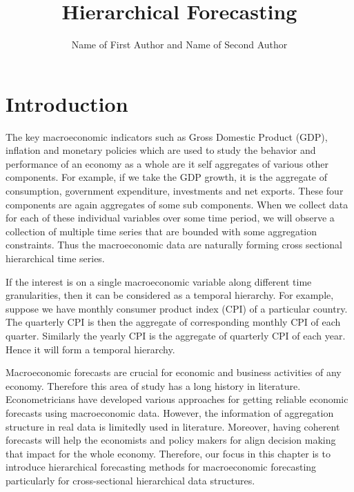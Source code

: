 \documentclass[graybox]{svmult}
\begin{document}
\title*{Hierarchical Forecasting}
\author{Name of First Author and Name of Second Author}
%
%
\maketitle



\section{Introduction}

The key macroeconomic indicators such as Gross Domestic Product (GDP), inflation and monetary policies which are used to study the behavior and performance of an economy as a whole are it self aggregates of various other components. 
For example, if we take the GDP growth, it is the aggregate of consumption, government expenditure, investments and net exports. These four components are again aggregates of some sub components. When we collect data for each of these individual variables over some time period, we will observe a collection of multiple time series that are bounded with some aggregation constraints. Thus the macroeconomic data are naturally forming cross sectional hierarchical time series. 

If the interest is on a single macroeconomic variable along different time granularities, then it can be considered as a temporal hierarchy. For example, suppose we have monthly consumer product index (CPI) of a particular country. The quarterly CPI is then the aggregate of corresponding monthly CPI of each quarter. Similarly the yearly CPI is the aggregate of quarterly CPI of each year. Hence it will form a temporal hierarchy. 

Macroeconomic forecasts are crucial for economic and business activities of any economy. Therefore this area of study has a long history in literature. Econometricians have developed various approaches for getting reliable economic forecasts using macroeconomic data. However, the information of aggregation structure in real data is limitedly used in literature. Moreover, having coherent forecasts will help the economists and policy makers for align decision making that impact for the whole economy. Therefore, our focus in this chapter is to introduce hierarchical forecasting methods for macroeconomic forecasting particularly for cross-sectional hierarchical data structures. 
\end{document}
